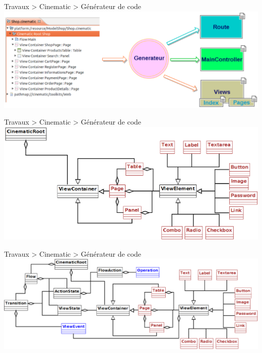 \documentclass[HeilHazel,pdf,final,colorBG,slideColor]{prosper}
\begin{document}
\begin{slide}{Travaux > Cinematic > Générateur de code}
    \includegraphics[scale=.3]{img/cinematic_gen.eps} 
\end{slide}

\begin{slide}{Travaux > Cinematic > Générateur de code}
    \includegraphics[scale=.3]{img/cinematic_exp1.eps} 
\end{slide}

\begin{slide}{Travaux > Cinematic > Générateur de code}
    \includegraphics[scale=.3]{img/cinematic_exp2.eps} 
\end{slide}
\end{document}
